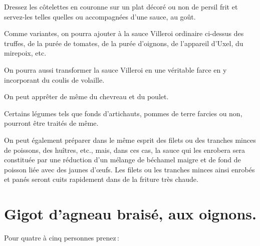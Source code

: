 Dressez les côtelettes en couronne sur un plat décoré ou non de persil frit et
servez-les telles quelles ou accompagnées d'une sauce, au goût.

\sk

Comme variantes, on pourra ajouter à la sauce Villeroi ordinaire ci-dessus des
truffes, de la purée de tomates, de la purée d'oignons, de l'appareil d'Uxel, du
mirepoix, etc.

On pourra aussi transformer la sauce Villeroi en une véritable farce en
y incorporant du coulis de volaille.

\sk

On peut apprêter de même du chevreau et du poulet.

\sk

Certains légumes tels que fonds d'artichauts, pommes de terre farcies ou non,
pourront être traités de même.

\sk

On peut également préparer dans le même esprit des filets ou des tranches
minces de poissons, des huîtres, etc., mais, dans ces cas, la sauce qui les
enrobera sera constituée par une réduction d'un mélange de béchamel maigre et
de fond de poisson liée avec des jaunes d'œufs. Les filets ou les tranches
minces ainsi enrobés et panés seront cuits rapidement dans de la friture très
chaude.

\section*{\centering Gigot d'agneau braisé, aux oignons.}
{}

Pour quatre à cinq personnes prenez :

\medskip

